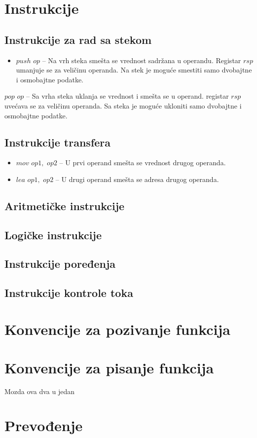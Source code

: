 \documentclass[a4paper, 10pt]{article}
\begin{document}
\section{Instrukcije}
	\subsection{Instrukcije za rad sa stekom}
		\begin{itemize}
			\item $push$ $op$ -- Na vrh steka smešta se vrednost sadržana u operandu. Registar $rsp$ umanjuje se za veličinu operanda. Na stek je moguće smestiti samo dvobajtne i osmobajtne podatke.
		\end{itemize} $pop$ $op$ -- Sa vrha steka uklanja se vrednost i smešta se u operand. registar $rsp$ uvećava se za veličinu operanda. Sa steka je moguće ukloniti samo dvobajtne i osmobajtne podatke. 
	\subsection{Instrukcije transfera}
		\begin{itemize}
			\item $mov$ $op1,$ $op2$ -- U prvi operand smešta se vrednost drugog operanda.
			\item $lea$ $op1,$ $op2$ -- U drugi operand smešta se adresa drugog operanda.
		\end{itemize}
	\subsection{Aritmetičke instrukcije}
	\subsection{Logičke instrukcije}
	\subsection{Instrukcije poređenja}
	\subsection{Instrukcije kontrole toka}
	
\section{Konvencije za pozivanje funkcija}
\section{Konvencije za pisanje funkcija} Mozda ova dva u jedan
\section{Prevođenje}
\end{document}
